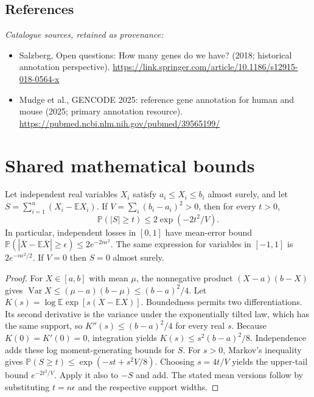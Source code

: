 \documentclass[11pt]{article}
\begin{document}
\subsection{References}
\noindent\emph{Catalogue sources, retained as provenance:}
\begin{itemize}
\item Salzberg, Open questions: How many genes do we have? (2018; historical annotation perspective). \url{https://link.springer.com/article/10.1186/s12915-018-0564-x}
\item Mudge et al., GENCODE 2025: reference gene annotation for human and mouse (2025; primary annotation resource). \url{https://pubmed.ncbi.nlm.nih.gov/pubmed/39565199/}
\end{itemize}




\section{Shared mathematical bounds}\label{app:bounds}
\begin{lemma}\label{lem:bounded}
Let independent real variables $X_i$ satisfy $a_i\leq X_i\leq b_i$ almost surely,
and let $S=\sum_{i=1}^n(X_i-\mathbb{E} X_i)$. If
$V=\sum_i(b_i-a_i)^2>0$, then for every $t>0$,
\[
 \mathbb{P}(|S|\geq t)\leq 2\exp(-2t^2/V).
\]
In particular, independent losses in $[0,1]$ have mean-error bound
$\mathbb{P}(|\overline X-\mathbb{E}\overline X|\geq\epsilon)
\leq2e^{-2n\epsilon^2}$. The same expression for variables in $[-1,1]$
is $2e^{-n\epsilon^2/2}$. If $V=0$ then $S=0$ almost surely.
\end{lemma}
\begin{proof}
For $X\in[a,b]$ with mean $\mu$, the nonnegative product
$(X-a)(b-X)$ gives
$\operatorname{Var} X\leq(\mu-a)(b-\mu)\leq(b-a)^2/4$.
Let $K(s)=\log\mathbb{E}\exp[s(X-\mathbb{E} X)]$.
Boundedness permits two differentiations. Its second derivative is the variance
under the exponentially tilted law, which has the same support, so
$K''(s)\leq(b-a)^2/4$ for every real $s$.
Because $K(0)=K'(0)=0$, integration yields
$K(s)\leq s^2(b-a)^2/8$.
Independence adds these log moment-generating bounds for $S$.
For $s>0$, Markov's inequality gives
$\mathbb{P}(S\geq t)\leq\exp(-st+s^2V/8)$.
Choosing $s=4t/V$ yields the upper-tail bound $e^{-2t^2/V}$.
Apply it also to $-S$ and add. The stated mean versions follow by substituting
$t=n\epsilon$ and the respective support widths.
\end{proof}
\end{document}
